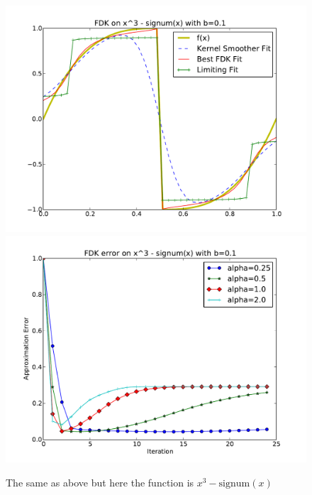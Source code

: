 \begin{figure}[!htb]
    \includegraphics[width=\linewidth]{figs/chap4/flip.pdf}
  \endminipage\hfill
    \includegraphics[width=\linewidth]{figs/chap4/fliperr.pdf}
  \endminipage
\caption[Fitting $x^3 - \mathrm{signum}(x)$]
{The same as above but here the function is $x^3 - \mathrm{signum}(x)$}
\end{figure}

